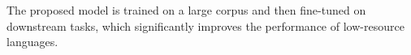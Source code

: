 The proposed model is trained on a large corpus and then fine-tuned on downstream tasks, which significantly improves the performance of low-resource languages.

